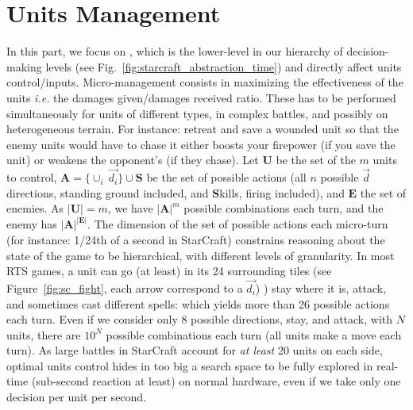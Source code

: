 \section{Units Management}
In this part, we focus on , which is the lower-level in our hierarchy of decision-making levels (see Fig.~\ref{fig:starcraft_abstraction_time}) and directly affect units control/inputs. Micro-management consists in maximizing the effectiveness of the units \textit{i.e.} the damages given/damages received ratio. These has to be performed simultaneously for units of different types, in complex battles, and possibly on heterogeneous terrain. 
For instance: retreat and save a wounded unit so that the enemy units would have to chase it either boosts your firepower (if you save the unit) or weakens the opponent's (if they chase). 
Let $\mathbf{U}$ be the set of the $m$ units to control, $\mathbf{A} = \{\cup_i\ \vec{d_i}\} \cup \mathbf{S}$ be the set of possible actions (all $n$ possible $\vec{d}$ directions, standing ground included, and $\mathbf{S}$kills, firing included), and $\mathbf{E}$ the set of enemies. As $|\mathbf{U}| = m$, we have $|\mathbf{A}|^{m}$ possible combinations each turn, and the enemy has $|\mathbf{A}|^{|\mathbf{E}|}$. 
The dimension of the set of possible actions each micro-turn (for instance: 1/24th of a second in StarCraft) constrains reasoning about the state of the game to be hierarchical, with different levels of granularity. In most RTS games, a unit can go (at least) in its 24 surrounding tiles (see Figure~\ref{fig:sc_fight}, each arrow correspond to a $\vec{d_i}$)
) %
stay where it is, attack, and sometimes cast different spells: which yields more than 26 possible actions each turn. Even if we consider only 8 possible directions, stay, and attack, with $N$ units, there are $10^N$ possible combinations each turn (all units make a move each turn). As large battles in StarCraft account for \textit{at least} 20 units on each side, optimal units control hides in too big a search space to be fully explored in real-time (sub-second reaction at least) on normal hardware, even if we take only one decision per unit per second.

